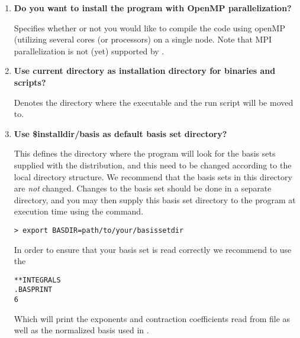 \begin{enumerate}

\item {\bf Do you want to install the program with OpenMP parallelization?}

Specifies whether or not you would like to compile the code using openMP (utilizing
several cores (or processors) on a single node.
Note that MPI parallelization
is not (yet) supported by {\lsdalton}.

%
%
%

\item {\bf Use current directory as installation directory for binaries and scripts?}

Denotes the directory where the executable and the
run script will be moved to.

\item {\bf Use \$installdir/basis as default basis set directory?}

This defines the directory where the program will look for the
basis sets supplied with the distribution, and this need to be
changed according to the local directory structure. We recommend
that the basis sets in this directory are {\em not} changed.
Changes to the basis set should be done in a separate
directory, and you may then supply this basis set directory to the program
at execution time using the command.
\begin{verbatim}
> export BASDIR=path/to/your/basissetdir
\end{verbatim}
In order to ensure that your basis set is read correctly we recommend to use the
\begin{verbatim}
**INTEGRALS
.BASPRINT 
6
\end{verbatim}
Which will print the exponents and contraction coefficients read from file as 
well as the normalized basis used in {\lsdalton}.  


\end{enumerate}
